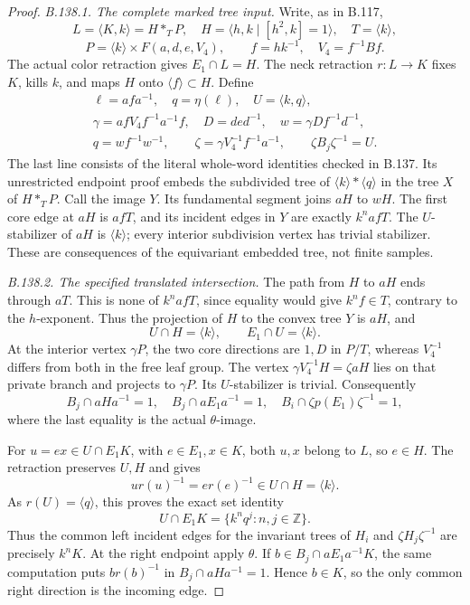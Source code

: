 \begin{proof}
\emph{B.138.1. The complete marked tree input.}
Write, as in B.117,
\[
L=\langle K,k\rangle=H*_{T}P,\quad
H=\langle h,k\mid[h^2,k]=1\rangle,\quad T=\langle k\rangle,
\]
\[
P=\langle k\rangle\times F(a,d,e,V_4),\qquad
f=hk^{-1},\quad V_4=f^{-1}Bf.
\]
The actual color retraction gives $E_1\cap L=H$. The neck
retraction $r:L\to K$ fixes $K$, kills $k$, and maps $H$ onto
$\langle f\rangle\subset H$. Define
\begin{equation}\label{eq:B138-fork}
\begin{gathered}
\ell=afa^{-1},\quad q=\eta(\ell),\quad U=\langle k,q\rangle,\\
\gamma=afV_4f^{-1}a^{-1}f,\quad D=ded^{-1},\quad
w=\gamma Df^{-1}d^{-1},\\
q=wf^{-1}w^{-1},\qquad
\zeta=\gamma V_4^{-1}f^{-1}a^{-1},\qquad
\zeta B_j\zeta^{-1}=U.
\end{gathered}
\end{equation}
The last line consists of the literal whole-word identities checked
in B.137. Its unrestricted endpoint proof embeds the subdivided tree
of $\langle k\rangle*\langle q\rangle$ in the tree $X$ of $H*_TP$.
Call the image $Y$. Its fundamental segment joins $aH$ to $wH$.
The first core edge at $aH$ is $afT$, and its incident edges in $Y$
are exactly $k^nafT$. The $U$-stabilizer of $aH$ is $\langle k\rangle$;
every interior subdivision vertex has trivial stabilizer. These are
consequences of the equivariant embedded tree, not finite samples.

\emph{B.138.2. The specified translated intersection.}
The path from $H$ to $aH$ ends through $aT$. This is none of
$k^nafT$, since equality would give $k^nf\in T$, contrary to
the $h$-exponent. Thus the projection of $H$ to the convex tree
$Y$ is $aH$, and
\[
U\cap H=\langle k\rangle,\qquad E_1\cap U=\langle k\rangle.
\]
At the interior vertex $\gamma P$, the two core directions are
$1,D$ in $P/T$, whereas $V_4^{-1}$ differs from both in the free
leaf group. The vertex $\gamma V_4^{-1}H=\zeta aH$ lies on that
private branch and projects to $\gamma P$. Its $U$-stabilizer is
trivial. Consequently
\[
B_j\cap aHa^{-1}=1,\quad B_j\cap aE_1a^{-1}=1,
\quad B_i\cap\zeta p(E_1)\zeta^{-1}=1,
\]
where the last equality is the actual $\theta$-image.

For $u=e x\in U\cap E_1K$, with $e\in E_1,x\in K$, both $u,x$
belong to $L$, so $e\in H$. The retraction preserves $U,H$ and gives
\[
u r(u)^{-1}=e r(e)^{-1}\in U\cap H=\langle k\rangle.
\]
As $r(U)=\langle q\rangle$, this proves the exact set identity
\[
U\cap E_1K=\{k^nq^j:n,j\in\mathbb Z\}.
\]
Thus the common left incident edges for the invariant trees of
$H_i$ and $\zeta H_j\zeta^{-1}$ are precisely $k^nK$.
At the right endpoint apply $\theta$. If
$b\in B_j\cap aE_1a^{-1}K$, the same computation puts
$b r(b)^{-1}$ in $B_j\cap aHa^{-1}=1$. Hence $b\in K$,
so the only common right direction is the incoming edge.


\end{proof}
